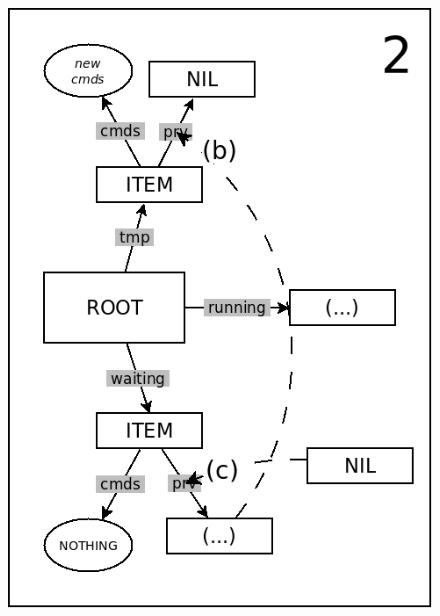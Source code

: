 \documentclass{acm_proc_article-sp}
\begin{document}
\begin{figure}
\begin{minipage}[t]{0.24\linewidth}
\includegraphics[scale=0.25]{queue-22.png}
\end{minipage}
\begin{minipage}[t]{0.24\linewidth}
\centering

\end{minipage}
\end{figure}
\end{document}

